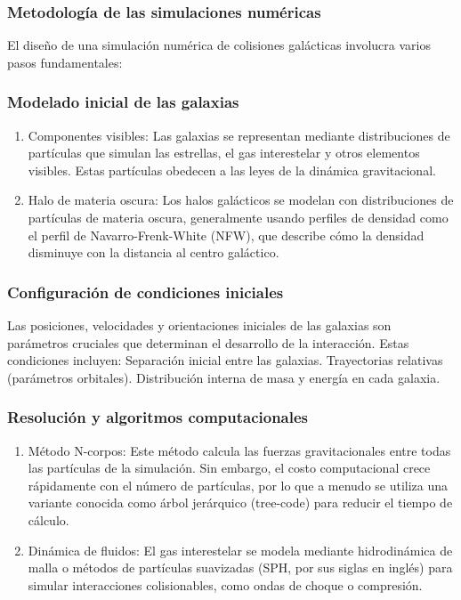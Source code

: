 \documentclass{article}
\begin{document}
\subsubsection{Metodología de las simulaciones numéricas}
El diseño de una simulación numérica de colisiones galácticas involucra varios pasos fundamentales:

\subsubsection*{Modelado inicial de las galaxias}

\begin{enumerate}
    \item Componentes visibles:
    Las galaxias se representan mediante distribuciones de partículas que simulan las estrellas, el gas interestelar y otros elementos visibles. Estas partículas obedecen a las leyes de la dinámica gravitacional.
    \item Halo de materia oscura:
Los halos galácticos se modelan con distribuciones de partículas de materia oscura, generalmente usando perfiles de densidad como el perfil de Navarro-Frenk-White (NFW), que describe cómo la densidad disminuye con la distancia al centro galáctico.
\end{enumerate}

\subsubsection*{Configuración de condiciones iniciales}

Las posiciones, velocidades y orientaciones iniciales de las galaxias son parámetros cruciales que determinan el desarrollo de la interacción. Estas condiciones incluyen:
Separación inicial entre las galaxias.
Trayectorias relativas (parámetros orbitales).
Distribución interna de masa y energía en cada galaxia.
\subsubsection*{Resolución y algoritmos computacionales}

\begin{enumerate}
    \item Método N-corpos:
Este método calcula las fuerzas gravitacionales entre todas las partículas de la simulación. Sin embargo, el costo computacional crece rápidamente con el número de partículas, por lo que a menudo se utiliza una variante conocida como árbol jerárquico (tree-code) para reducir el tiempo de cálculo.
    \item Dinámica de fluidos:
El gas interestelar se modela mediante hidrodinámica de malla o métodos de partículas suavizadas (SPH, por sus siglas en inglés) para simular interacciones colisionables, como ondas de choque o compresión.
\end{enumerate}
\end{document}
